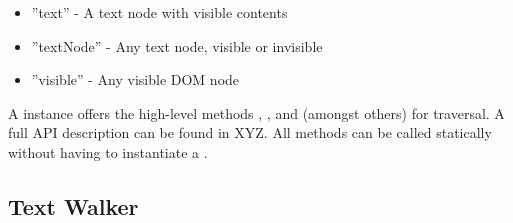 \begin{itemize}
\item ''text'' - A text node with visible contents
\item ''textNode'' - Any text node, visible or invisible
\item ''visible'' - Any visible DOM node
\end{itemize}

A  instance offers the high-level methods , ,  and  (amongst others) for traversal. A full API description can be found in XYZ. All methods can be called statically without having to instantiate a .







\subsection{Text Walker}

